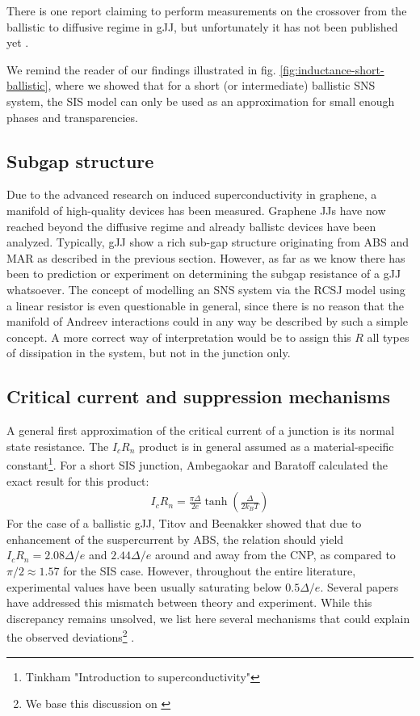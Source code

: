 There is one report claiming to perform measurements on the crossover from the ballistic to diffusive regime in gJJ, but unfortunately it has not been published yet \cite{kratz_ballistic_2016}.

We remind the reader of our findings illustrated in fig. \ref{fig:inductance-short-ballistic}, where we showed that for a short (or intermediate) ballistic SNS system, the SIS model can only be used as an approximation for small enough phases and transparencies.

\subsection{Subgap structure}
Due to the advanced research on induced superconductivity in graphene, a manifold of high-quality devices has been measured.
Graphene JJs have now reached beyond the diffusive regime and already ballistc devices have been analyzed.
Typically, gJJ show a rich sub-gap structure originating from ABS and MAR as described in the previous section.
However, as far as we know there has been to prediction or experiment on determining the subgap resistance of a gJJ whatsoever.
The concept of modelling an SNS system via the RCSJ model using a linear resistor is even questionable in general, since there is no reason that the manifold of Andreev interactions could in any way be described by such a simple concept.
A more correct way of interpretation would be to assign this $R$ all types of dissipation in the system, but not in the junction only.

\subsection{Critical current and suppression mechanisms}
A general first approximation of the critical current of a junction is its normal state resistance.
The $I_c R_n$ product is in general assumed as a material-specific constant\footnote{Tinkham "Introduction to superconductivity"}.
For a short SIS junction, Ambegaokar and Baratoff calculated the exact result for this product:
\begin{eqnarray}
I_c R_n = \frac{\pi\Delta}{2e}\tanh\left(\frac{\Delta}{2k_BT}\right)
\end{eqnarray}
For the case of a ballistic gJJ, Titov and Beenakker showed that due to enhancement of the suspercurrent by ABS, the relation should yield $I_cR_n=2.08\Delta/e$ and $2.44\Delta/e$ around and away from the CNP, as compared to $\pi/2\approx1.57$ for the SIS case.
However, throughout the entire literature, experimental values have been usually saturating below $0.5\Delta/e$.
Several papers have addressed this mismatch between theory and experiment.
While this discrepancy remains unsolved, we list here several mechanisms that could explain the observed deviations\footnote{We base this discussion on \cite{choi_complete_2013}} .

